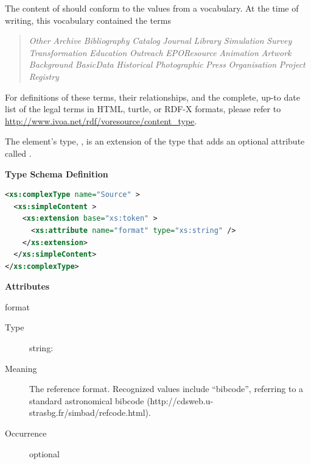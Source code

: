 \documentclass[11pt,a4paper]{ivoa}
\begin{document}
The content of  should conform to the values from a
vocabulary.  At the time of writing, this vocabulary contained the terms

\begin{quotation}\noindent
\textsl{Other}
\textsl{Archive}
\textsl{Bibliography}
\textsl{Catalog}
\textsl{Journal}
\textsl{Library}
\textsl{Simulation}
\textsl{Survey}
\textsl{Transformation}
\textsl{Education}
\textsl{Outreach}
\textsl{EPOResource}
\textsl{Animation}
\textsl{Artwork}
\textsl{Background}
\textsl{BasicData}
\textsl{Historical}
\textsl{Photographic}
\textsl{Press}
\textsl{Organisation}
\textsl{Project}
\textsl{Registry}

\end{quotation}

For definitions of these terms, their relationships, and the complete,
up-to date list of the legal terms in HTML, turtle, or RDF-X formats,
please refer to \url{http://www.ivoa.net/rdf/voresource/content_type}.


The  element's type,
, is an extension of the
 type that adds an optional attribute called
.  


\begin{generated}
\begingroup
      	\renewcommand*\descriptionlabel[1]{%
      	\hbox to 5.5em{\emph{#1}\hfil}}\vspace{1ex}\noindent\textbf{ Type Schema Definition}

\begin{lstlisting}[language=XML,basicstyle=\footnotesize]
<xs:complexType name="Source" >
  <xs:simpleContent >
    <xs:extension base="xs:token" >
      <xs:attribute name="format" type="xs:string" />
    </xs:extension>
  </xs:simpleContent>
</xs:complexType>
\end{lstlisting}

\vspace{0.5ex}\noindent\textbf{ Attributes}

\begingroup\small\begin{bigdescription}
\item[format]
\begin{description}
\item[Type] string: 
\item[Meaning] 
                 The reference format.  Recognized values include “bibcode”, 
                 referring to a standard astronomical bibcode 
                 (http://cdsweb.u-strasbg.fr/simbad/refcode.html).  
               
\item[Occurrence] optional
\end{description}


\end{bigdescription}\endgroup

\endgroup
\end{generated}
\end{document}
